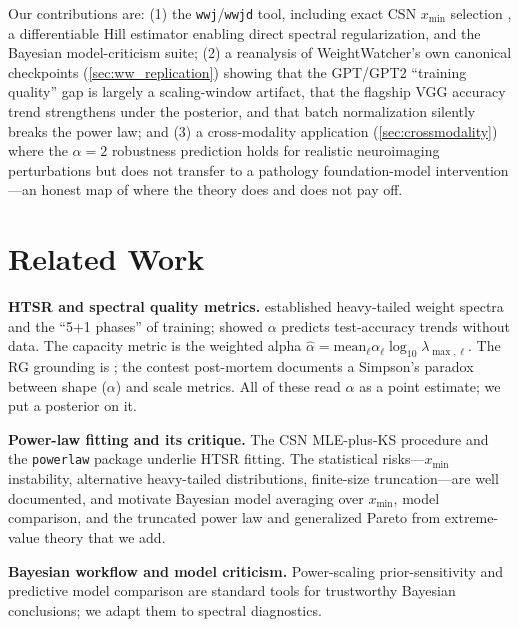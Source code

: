 \documentclass{article} %
\begin{document}
Our contributions are: (1) the \texttt{wwj}/\texttt{wwjd} tool, including exact CSN $x_{\min}$ selection
\citep{clauset2009powerlaw}, a differentiable Hill estimator enabling direct spectral regularization, and
the Bayesian model-criticism suite; (2) a reanalysis of WeightWatcher's own canonical checkpoints
(\cref{sec:ww_replication}) showing that the GPT/GPT2 ``training quality'' gap is largely a
scaling-window artifact, that the flagship VGG accuracy trend strengthens under the posterior, and that
batch normalization silently breaks the power law; and (3) a cross-modality application
(\cref{sec:crossmodality}) where the $\alpha = 2$ robustness prediction holds for realistic neuroimaging
perturbations but does not transfer to a pathology foundation-model intervention---an honest map of where
the theory does and does not pay off.

\section{Related Work}
\label{sec:related}

\textbf{HTSR and spectral quality metrics.} \citet{martin2021implicit,martin2019traditional} established
heavy-tailed weight spectra and the ``5+1 phases'' of training; \citet{martin2021predicting} showed
$\alpha$ predicts test-accuracy trends without data. The capacity metric is the weighted alpha
$\hat\alpha = \text{mean}_\ell \alpha_\ell \log_{10}\lambda_{\max,\ell}$. The RG grounding is
\citet{martin2026rg,martin2025setol}; the contest post-mortem \citep{martin2021postmortem} documents a
Simpson's paradox between shape ($\alpha$) and scale metrics. All of these read $\alpha$ as a point
estimate; we put a posterior on it.

\textbf{Power-law fitting and its critique.} The CSN MLE-plus-KS procedure \citep{clauset2009powerlaw}
and the \texttt{powerlaw} package \citep{alstott2014powerlaw} underlie HTSR fitting. The statistical
risks---$x_{\min}$ instability, alternative heavy-tailed distributions, finite-size truncation---are
well documented, and motivate Bayesian model averaging over $x_{\min}$, model comparison, and the
truncated power law and generalized Pareto from extreme-value theory \citep{coles2001evt} that we add.

\textbf{Bayesian workflow and model criticism.} Power-scaling prior-sensitivity
\citep{kallioinen2023priorsense} and predictive model comparison \citep{vehtari2017practical} are
standard tools for trustworthy Bayesian conclusions; we adapt them to spectral diagnostics.
\end{document}
